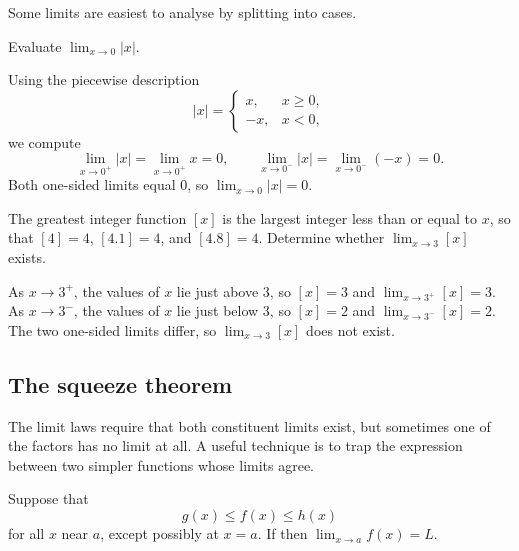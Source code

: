 Some limits are easiest to analyse by splitting into cases.

\begin{workedexample}
\begin{example}
Evaluate \(\displaystyle \lim_{x \to 0} |x|\).
\end{example}

\begin{solution}
Using the piecewise description
\[
|x| =
\begin{cases}
x, & x \ge 0,\\[4pt]
-x, & x < 0,
\end{cases}
\]
we compute
\[
\lim_{x \to 0^{+}} |x| = \lim_{x \to 0^{+}} x = 0,
\qquad
\lim_{x \to 0^{-}} |x| = \lim_{x \to 0^{-}} (-x) = 0.
\]
Both one-sided limits equal \(0\), so \(\displaystyle \lim_{x \to 0} |x| = 0\).
\end{solution}
\end{workedexample}

\begin{workedexample}
\begin{example}
The greatest integer function \([x]\) is the largest integer less than or equal to \(x\), so that \([4] = 4\), \([4.1] = 4\), and \([4.8] = 4\). Determine whether \(\displaystyle \lim_{x \to 3} [x]\) exists.
\end{example}

\begin{solution}
As \(x \to 3^{+}\), the values of \(x\) lie just above \(3\), so \([x] = 3\) and \(\displaystyle \lim_{x \to 3^{+}} [x] = 3\). As \(x \to 3^{-}\), the values of \(x\) lie just below \(3\), so \([x] = 2\) and \(\displaystyle \lim_{x \to 3^{-}} [x] = 2\). The two one-sided limits differ, so \(\displaystyle \lim_{x \to 3} [x]\) does not exist.
\end{solution}
\end{workedexample}

\subsection{The squeeze theorem}

The limit laws require that both constituent limits exist, but sometimes one of the factors has no limit at all. A useful technique is to trap the expression between two simpler functions whose limits agree.

\begin{theorem}
Suppose that
\[
g(x) \le f(x) \le h(x)
\]
for all \(x\) near \(a\), except possibly at \(x = a\). If
then \(\displaystyle \lim_{x \to a} f(x) = L\).
\end{theorem}


